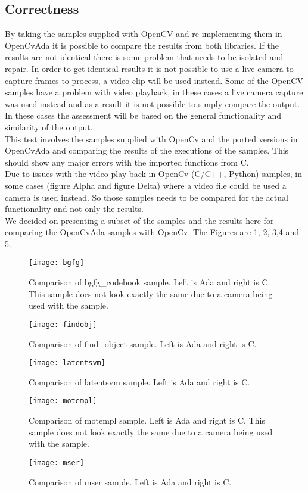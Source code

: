 \subsection{Correctness}
By taking the samples supplied with OpenCV and re-implementing them in OpenCvAda it is possible to compare the results from both libraries. If the results are not identical there is some problem that needs to be isolated and repair. In order to get identical results it is not possible to use a live camera to capture frames to process, a video clip will be used instead. Some of the OpenCV samples have a problem with video playback, in these cases a live camera capture was used instead and as a result it is not possible to simply compare the output. In these cases the assessment will be based on the general functionality and similarity of the output.
\\
This test involves the samples supplied with OpenCv and the ported versions in OpenCvAda and comparing the results of the executions of the samples. This should show any major errors with the imported functions from C.
\\
Due to issues with the video play back in OpenCv (C/C++, Python) samples, in some cases (figure Alpha and figure Delta) where a video file could be used a camera is used instead. So those samples needs to be compared for the actual functionality and not only the results.
\\
We decided on presenting a subset of the samples and the results here for comparing the OpenCvAda samples with OpenCv. The Figures are \ref{fig:bgfg}, \ref{fig:findobj}, \ref{fig:latentsvm},\ref{fig:motempl} and \ref{fig:mser}.
\begin{figure}
\centering
\texttt{[image: bgfg]}
\caption{Comparison of bgfg_codebook sample. Left is Ada and right is C. This sample does not look exactly the same due to a camera being used with the sample.}
\label{fig:bgfg}
\end{figure}
\begin{figure}
\centering
\texttt{[image: findobj]}
\caption{Comparison of find_object sample. Left is Ada and right is C.}
\label{fig:findobj}
\end{figure}
\begin{figure}
\centering
\texttt{[image: latentsvm]}
\caption{Comparison of latentsvm sample. Left is Ada and right is C.}
\label{fig:latentsvm}
\end{figure}
\begin{figure}
\centering
\texttt{[image: motempl]}
\caption{Comparison of motempl sample. Left is Ada and right is C. This sample does not look exactly the same due to a camera being used with the sample.}
\label{fig:motempl}
\end{figure}
\begin{figure}
\centering
\texttt{[image: mser]}
\caption{Comparison of mser sample. Left is Ada and right is C.}
\label{fig:mser}
\end{figure}
